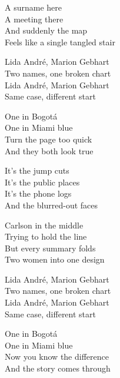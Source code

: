 \begin{lyrics}
A surname here\\
A meeting there\\
And suddenly the map\\
Feels like a single tangled stair

Lida André, Marion Gebhart\\
Two names, one broken chart\\
Lida André, Marion Gebhart\\
Same case, different start

One in Bogotá\\
One in Miami blue\\
Turn the page too quick\\
And they both look true

It’s the jump cuts\\
It’s the public places\\
It’s the phone logs\\
And the blurred-out faces

Carlson in the middle\\
Trying to hold the line\\
But every summary folds\\
Two women into one design

Lida André, Marion Gebhart\\
Two names, one broken chart\\
Lida André, Marion Gebhart\\
Same case, different start

One in Bogotá\\
One in Miami blue\\
Now you know the difference\\
And the story comes through
\end{lyrics}

